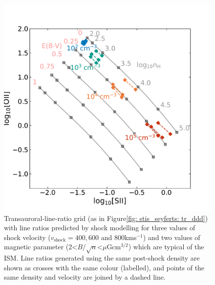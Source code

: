 \begin{figure}
    \centering 
    \includegraphics[width=\linewidth]{figures/tr_grid_shock_modelling/tr_shocks_ddd_bn2_bn4.pdf}
    \caption[Transauroral-line-ratio grid for shock models of different magnetic parameters and shock velocities.]{Transauroral-line-ratio grid (as in Figure\;\ref{fig: stis_seyferts: tr_ddd}) with line ratios predicted by shock modelling for three values of shock velocity ($v_\mathrm{shock}=400, 600$ and 800\;km\;s$^{-1}$) and two values of magnetic parameter (2\;\textless\;$B/\sqrt{n}$\;\textless{}\;$\mu$G\;cm$^{3/2}$) which are typical of the ISM. Line ratios generated using the same post-shock density are shown as crosses with the same colour (labelled), and points of the same density and velocity are joined by a dashed line.}
    \label{fig: tr_grid_shock_modelling: tr_shock_ddd_bn_vary}
\end{figure}


